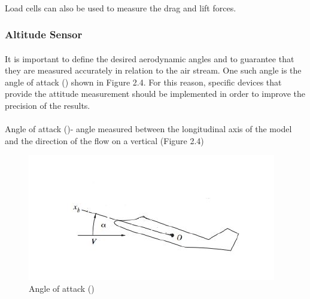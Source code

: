 \paragraph{}Load cells can also be used to measure the drag and lift forces.
\subsubsection{Altitude Sensor}
\paragraph{}It is important to define the desired aerodynamic angles and to guarantee that they are measured accurately in relation to the air stream. One such angle is the angle of attack (\textalpha) shown in Figure 2.4. For this reason, specific devices that provide the attitude measurement should be implemented in order to improve the precision of the results.
\paragraph{}Angle of attack (\textalpha)- angle measured between the longitudinal axis of the model and the direction of the flow on a vertical (Figure 2.4)
\begin{center}
	\begin{figure}[!h]
	\centering
	\includegraphics{Figures/Fig10}
	\caption{Angle of attack (\textalpha)}
	\end{figure}
\end{center}